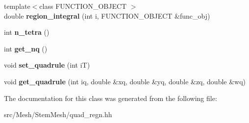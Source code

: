 \begin{DoxyCompactItemize}
{\footnotesize template$<$class F\+U\+N\+C\+T\+I\+O\+N\+\_\+\+O\+B\+J\+E\+CT $>$ }\\double {\bfseries region\+\_\+integral} (int i, F\+U\+N\+C\+T\+I\+O\+N\+\_\+\+O\+B\+J\+E\+CT \&func\+\_\+obj)
\item 
\mbox{\label{classStemMesh3D_1_1QuadRegion_ad9694c8d6c595fdbe0963a04e727bb6e}} 
int {\bfseries n\+\_\+tetra} ()
\item 
\mbox{\label{classStemMesh3D_1_1QuadRegion_a9c1a9ba6f359ba0d37939e55bd38f5c3}} 
int {\bfseries get\+\_\+nq} ()
\item 
\mbox{\label{classStemMesh3D_1_1QuadRegion_aa69916e213e1d385d57bfa98eeaa101c}} 
void {\bfseries set\+\_\+quadrule} (int iT)
\item 
\mbox{\label{classStemMesh3D_1_1QuadRegion_a42a9671805580d53fd2ca5ecfb763e2d}} 
void {\bfseries get\+\_\+quadrule} (int iq, double \&xq, double \&yq, double \&zq, double \&wq)
\end{DoxyCompactItemize}


The documentation for this class was generated from the following file\+:\begin{DoxyCompactItemize}
\item 
src/\+Mesh/\+Stem\+Mesh/quad\+\_\+regn.\+hh\end{DoxyCompactItemize}
